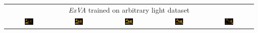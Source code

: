 \begin{table}[!htb]
\begin{tabular*}{\textwidth}{ c c c c c }
        
        \multicolumn{5}{c}{\textit{ExVA} trained on arbitrary light dataset} \\
          \includegraphics[width=0.19\textwidth]{figures/results/arb_set/dynamic_light/exva_rand_vc0_ld-60.png}
        & \includegraphics[width=0.19\textwidth]{figures/results/arb_set/dynamic_light/exva_rand_vc0_ld-30.png}
        & \includegraphics[width=0.19\textwidth]{figures/results/arb_set/dynamic_light/exva_rand_vc0_ld0.png}
        & \includegraphics[width=0.19\textwidth]{figures/results/arb_set/dynamic_light/exva_rand_vc0_ld30.png} 
        & \includegraphics[width=0.19\textwidth]{figures/results/arb_set/dynamic_light/exva_rand_vc0_ld60.png} \\
        

\end{tabular*}
\end{table}
